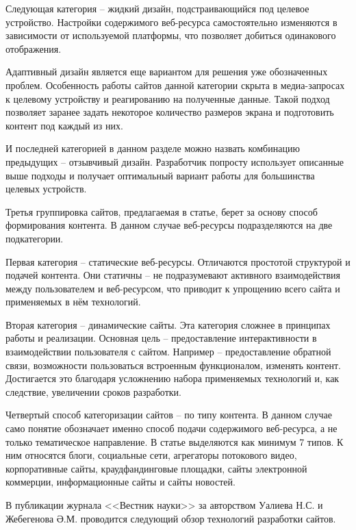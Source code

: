 Следующая категория -- жидкий дизайн, подстраивающийся под целевое устройство.
Настройки содержимого веб-ресурса самостоятельно изменяются в зависимости от используемой платформы, что позволяет добиться одинакового отображения.

Адаптивный дизайн является еще вариантом для решения уже обозначенных проблем.
Особенность работы сайтов данной категории скрыта в медиа-запросах к целевому устройству и реагированию на полученные данные.
Такой подход позволяет заранее задать некоторое количество размеров экрана и подготовить контент под каждый из них.

И последней категорией в данном разделе можно назвать комбинацию предыдущих -- отзывчивый дизайн.
Разработчик попросту использует описанные выше подходы и получает оптимальный вариант работы для большинства целевых устройств.


Третья группировка сайтов, предлагаемая в статье, берет за основу способ формирования контента.
В данном случае веб-ресурсы подразделяются на две подкатегории.

Первая категория -- статические веб-ресурсы.
Отличаются простотой структурой и подачей контента.
Они статичны -- не подразумевают активного взаимодействия между пользователем и веб-ресурсом, что приводит к упрощению всего сайта и применяемых в нём технологий.

Вторая категория -- динамические сайты.
Эта категория сложнее в принципах работы и реализации.
Основная цель -- предоставление интерактивности в взаимодействии пользователя с сайтом.
Например -- предоставление обратной связи, возможности пользоваться встроенным функционалом, изменять контент.
Достигается это благодаря усложнению набора применяемых технологий и, как следствие, увеличении сроков разработки.


Четвертый способ категоризации сайтов -- по типу контента.
В данном случае само понятие обозначает именно способ подачи содержимого веб-ресурса, а не только тематическое направление.
В статье выделяются как минимум 7 типов.
К ним относятся блоги, социальные сети, агрегаторы потокового видео, корпоративные сайты, краудфандинговые площадки, сайты электронной коммерции, информационные сайты и сайты новостей.


В публикации журнала <<Вестник науки>> за авторством Уалиева Н.С. и Жебегенова Ә.М. \cite{ualiev-jebegenov-issledovanie} проводится следующий обзор технологий разработки сайтов.

